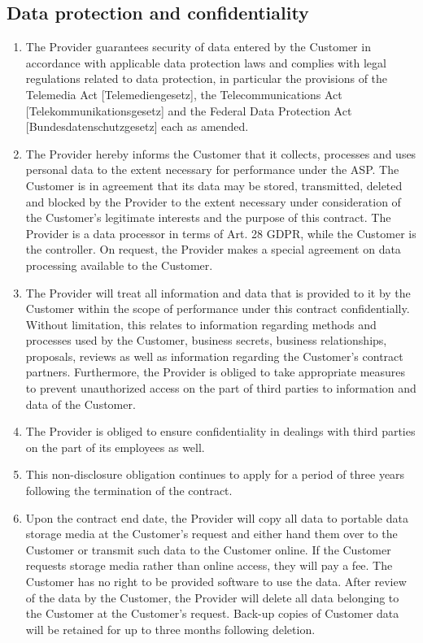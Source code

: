 \documentclass{terms}
\begin{document}
\subsection{Data protection and confidentiality}
\begin{enumerate}
\item The Provider guarantees security of data entered by the Customer in accordance with applicable data protection laws and complies with legal regulations related to data protection, in particular the provisions of the Telemedia Act [Telemediengesetz], the Telecommunications Act [Telekommunikationsgesetz] and the Federal Data Protection Act [Bundesdatenschutzgesetz] each as amended.
\item The Provider hereby informs the Customer that it collects, processes and uses personal data to the extent necessary for performance under the ASP.
      The Customer is in agreement that its data may be stored, transmitted, deleted and blocked by the Provider to the extent necessary under consideration of the Customer's legitimate interests and the purpose of this contract.
      The Provider is a data processor in terms of Art. 28 GDPR, while the Customer is the controller.
      On request, the Provider makes a special agreement on data processing available to the Customer.
\item The Provider will treat all information and data that is provided to it by the Customer within the scope of performance under this contract confidentially.
      Without limitation, this relates to information regarding methods and processes used by the Customer, business secrets, business relationships, proposals, reviews as well as information regarding the Customer's contract partners.
      Furthermore, the Provider is obliged to take appropriate measures to prevent unauthorized access on the part of third parties to information and data of the Customer.
\item The Provider is obliged to ensure confidentiality in dealings with third parties on the part of its employees as well.
\item This non-disclosure obligation continues to apply for a period of three years following the termination of the contract.
\item Upon the contract end date, the Provider will copy all data to portable data storage media at the Customer's request and either hand them over to the Customer or transmit such data to the Customer online.
      If the Customer requests storage media rather than online access, they will pay a fee.
      The Customer has no right to be provided software to use the data.
      After review of the data by the Customer, the Provider will delete all data belonging to the Customer at the Customer's request.
      Back-up copies of Customer data will be retained for up to three months following deletion.
\end{enumerate}
\end{document}
